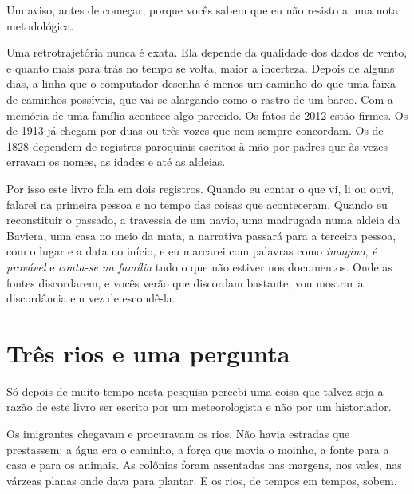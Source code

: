 \documentclass[
  brazilian,
  11pt,
  openany]{book}
\begin{document}
Um aviso, antes de começar, porque vocês sabem que eu não resisto a uma
nota metodológica.

Uma retrotrajetória nunca é exata. Ela depende da qualidade dos dados de
vento, e quanto mais para trás no tempo se volta, maior a incerteza.
Depois de alguns dias, a linha que o computador desenha é menos um
caminho do que uma faixa de caminhos possíveis, que vai se alargando
como o rastro de um barco. Com a memória de uma família acontece algo
parecido. Os fatos de 2012 estão firmes. Os de 1913 já chegam por duas
ou três vozes que nem sempre concordam. Os de 1828 dependem de registros
paroquiais escritos à mão por padres que às vezes erravam os nomes, as
idades e até as aldeias.

Por isso este livro fala em dois registros. Quando eu contar o que vi,
li ou ouvi, falarei na primeira pessoa e no tempo das coisas que
aconteceram. Quando eu reconstituir o passado, a travessia de um navio,
uma madrugada numa aldeia da Baviera, uma casa no meio da mata, a
narrativa passará para a terceira pessoa, com o lugar e a data no
início, e eu marcarei com palavras como \emph{imagino}, \emph{é
provável} e \emph{conta-se na família} tudo o que não estiver nos
documentos. Onde as fontes discordarem, e vocês verão que discordam
bastante, vou mostrar a discordância em vez de escondê-la.

\section{Três rios e uma pergunta}\label{truxeas-rios-e-uma-pergunta}

Só depois de muito tempo nesta pesquisa percebi uma coisa que talvez
seja a razão de este livro ser escrito por um meteorologista e não por
um historiador.

Os imigrantes chegavam e procuravam os rios. Não havia estradas que
prestassem; a água era o caminho, a força que movia o moinho, a fonte
para a casa e para os animais. As colônias foram assentadas nas margens,
nos vales, nas várzeas planas onde dava para plantar. E os rios, de
tempos em tempos, sobem.
\end{document}
